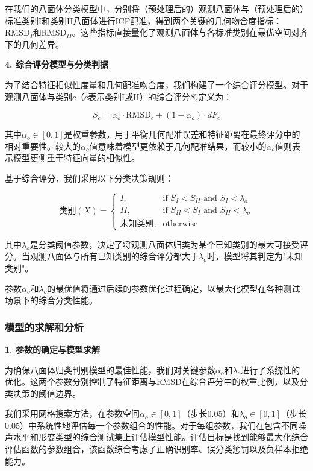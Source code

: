 在我们的八面体分类模型中，分别将（预处理后的）观测八面体与（预处理后的）标准类别I和类别II八面体进行ICP配准，得到两个关键的几何吻合度指标：$\text{RMSD}_I$和$\text{RMSD}_{II}$。这些指标直接量化了观测八面体与各标准类别在最优空间对齐下的几何差异。

\textbf{4. 综合评分模型与分类判据}

为了结合特征相似性度量和几何配准吻合度，我们构建了一个综合评分模型。对于观测八面体与类别$c$（$c$表示类别I或II）的综合评分$S_c$定义为：

\begin{equation}
S_c = \alpha_o \cdot \text{RMSD}_c + (1 - \alpha_o) \cdot dF_c
\end{equation}

其中$\alpha_o \in [0,1]$是权重参数，用于平衡几何配准误差和特征距离在最终评分中的相对重要性。较大的$\alpha_o$值意味着模型更依赖于几何配准结果，而较小的$\alpha_o$值则表示模型更侧重于特征向量的相似性。

基于综合评分，我们采用以下分类决策规则：

\begin{equation}
\text{类别}(X) = 
\begin{cases}
I, & \text{if } S_I < S_{II} \text{ and } S_I < \lambda_o \\
II, & \text{if } S_{II} < S_{I} \text{ and } S_{II} < \lambda_o \\
\text{未知类别}, & \text{otherwise}
\end{cases}
\end{equation}

其中$\lambda_o$是分类阈值参数，决定了将观测八面体归类为某个已知类别的最大可接受评分。当观测八面体与所有已知类别的综合评分都大于$\lambda_o$时，模型将其判定为"未知类别"。

参数$\alpha_o$和$\lambda_o$的最优值将通过后续的参数优化过程确定，以最大化模型在各种测试场景下的综合分类性能。

\subsubsection{模型的求解和分析}

\textbf{1. 参数的确定与模型求解}

为确保八面体归类判别模型的最佳性能，我们对关键参数$\alpha_o$和$\lambda_o$进行了系统性的优化。这两个参数分别控制了特征距离与RMSD在综合评分中的权重比例，以及分类决策的阈值边界。

我们采用网格搜索方法，在参数空间$\alpha_o \in [0, 1]$（步长0.05）和$\lambda_o \in [0, 1]$（步长0.05）中系统性地评估每一个参数组合的性能。对于每组参数，我们在包含不同噪声水平和形变类型的综合测试集上评估模型性能。评估目标是找到能够最大化综合评估函数的参数组合，该函数综合考虑了正确识别率、误分类惩罚以及负样本拒绝能力。

